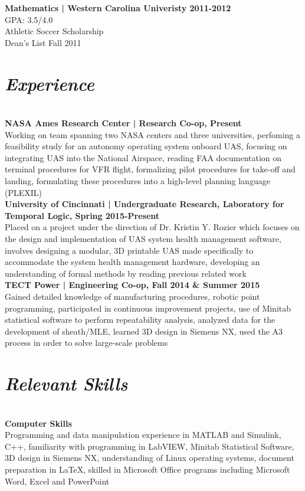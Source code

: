 \documentclass{res}
\begin{document}
\begin{minipage}[t][0pt]{\linewidth}
{\begin{resume}
{\bf Mathematics | Western Carolina Univeristy 2011-2012}\\ 
GPA: 3.5/4.0 \\
Athletic Soccer Scholarship\\
Dean's List Fall 2011\\


\section{\sl \large Experience} \\
{\bf NASA Ames Research Center | Research Co-op, Present} \\ 
Working on team spanning two NASA centers and three universities, perfoming a feasibility study for an autonomy operating system onboard UAS, focusing on integrating UAS into the National Airspace, reading FAA documentation on terminal procedures for VFR flight, formalizing pilot procedures for take-off and landing, formulating these procedures into a high-level planning language (PLEXIL) \\

{\bf University of Cincinnati | Undergraduate Research, Laboratory for Temporal Logic, Spring 2015-Present} \\
Placed on a project under the direction of Dr. Kristin Y. Rozier which focuses on the design and implementation of UAS system health management software, involves designing a modular, 3D printable UAS made specifically to accommodate the system health management hardware, developing an understanding of formal methods by reading previous related work\\

{\bf TECT Power | Engineering Co-op, Fall 2014 \& Summer 2015}\\
Gained detailed knowledge of manufacturing procedures, robotic point programming, participated in continuous improvement projects, use of Minitab statistical software to perform repeatability analysis, analyzed data for the development of sheath/MLE, learned 3D design in Siemens NX, used the A3 process in order to solve large-scale problems\\


\section{\sl \large Relevant Skills} \\
{\bf Computer Skills}\\
Programming and data manipulation experience in MATLAB and Simulink, C++, familiarity with programming in LabVIEW, Minitab Statistical Software, 3D design in Siemens NX, understanding of Linux operating systems, document preparation in LaTeX, skilled in Microsoft Office programs including Microsoft Word, Excel and PowerPoint \\


\end{resume}}
\end{minipage}
\end{document}
